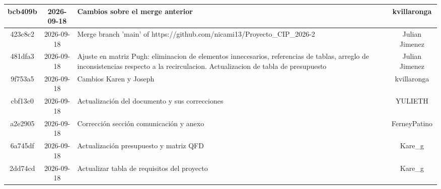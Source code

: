 \begin{longtable}{|c|c|p{7cm}|c|}
bcb409b & 2026-09-18 & Cambios sobre el merge anterior & kvillaronga \\ \hline
423c8c2 & 2026-09-18 & Merge branch 'main' of https://github.com/nicami13/Proyecto\_CIP\_2026-2 & Julian Jimenez \\ \hline
481dfa3 & 2026-09-18 & Ajuste en matriz Pugh: eliminacion de elementos innecesarios, referencias de tablas, arreglo de inconsistencias respecto a la recirculacion. Actualizacion de tabla de presupuesto & Julian Jimenez \\ \hline
9f753a5 & 2026-09-18 & Cambios Karen y Joseph & kvillaronga \\ \hline
cbf13c0 & 2026-09-18 & Actualización del documento y sus correcciones & YULIETH \\ \hline
a2e2905 & 2026-09-18 & Corrección sección comunicación y anexo & FerneyPatino \\ \hline
6a745df & 2026-09-18 & Actualización presupuesto y matriz QFD & Kare\_g \\ \hline
2dd74cd & 2026-09-18 & Actualizar tabla de requisitos del proyecto & Kare\_g \\ \hline
\end{longtable}


